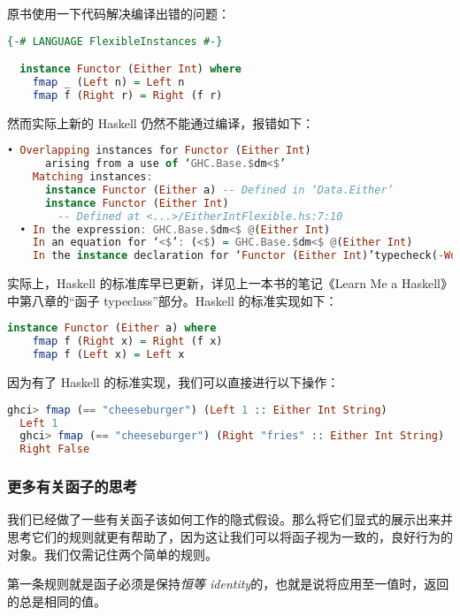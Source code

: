 \documentclass[./main.tex]{subfiles}
\begin{document}
原书使用一下代码解决编译出错的问题：

\begin{lstlisting}[language=Haskell]
  {-# LANGUAGE FlexibleInstances #-}

  instance Functor (Either Int) where
    fmap _ (Left n) = Left n
    fmap f (Right r) = Right (f r)
\end{lstlisting}

然而实际上新的 Haskell 仍然不能通过编译，报错如下：

\begin{lstlisting}[language=Haskell]
  • Overlapping instances for Functor (Either Int)
      arising from a use of ‘GHC.Base.$dm<$’
    Matching instances:
      instance Functor (Either a) -- Defined in ‘Data.Either’
      instance Functor (Either Int)
        -- Defined at <...>/EitherIntFlexible.hs:7:10
  • In the expression: GHC.Base.$dm<$ @(Either Int)
    In an equation for ‘<$’: (<$) = GHC.Base.$dm<$ @(Either Int)
    In the instance declaration for ‘Functor (Either Int)’typecheck(-Wdeferred-type-errors)
\end{lstlisting}

实际上，Haskell 的标准库早已更新，详见上一本书的笔记《Learn Me a Haskell》中第八章的“函子 typeclass”部分。Haskell 的标准实现如下：

\begin{lstlisting}[language=Haskell]
  instance Functor (Either a) where
    fmap f (Right x) = Right (f x)
    fmap f (Left x) = Left x
\end{lstlisting}

因为有了 Haskell 的标准实现，我们可以直接进行以下操作：

\begin{lstlisting}[language=Haskell]
  ghci> fmap (== "cheeseburger") (Left 1 :: Either Int String)
  Left 1
  ghci> fmap (== "cheeseburger") (Right "fries" :: Either Int String)
  Right False
\end{lstlisting}

\subsubsection*{更多有关函子的思考}

我们已经做了一些有关函子该如何工作的隐式假设。那么将它们显式的展示出来并思考它们的规则就更有帮助了，因为这让我们可以将函子视为一致的，良好行为的
对象。我们仅需记住两个简单的规则。

第一条规则就是函子必须是保持\textit{恒等 identity}的，也就是说将应用至一值时，返回的总是相同的值。
\end{document}
